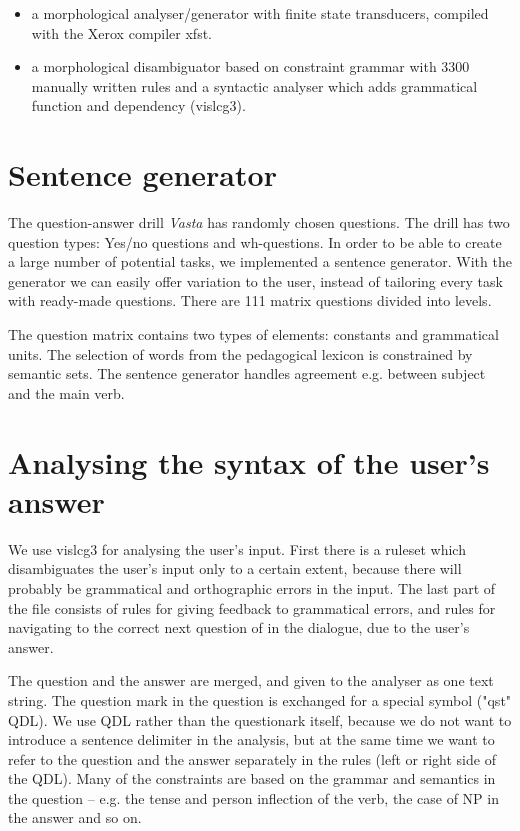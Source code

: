 \documentclass[11pt]{article}
\begin{document}
\begin{itemize}
\item a morphological analyser/generator with finite state transducers, compiled with the Xerox compiler xfst.  
\item a morphological disambiguator based on constraint grammar with 3300 manually written rules and a syntactic analyser which adds grammatical function and dependency (vislcg3). 
\end{itemize}


\section{Sentence generator}
The question-answer drill \textit{Vasta} has randomly chosen questions. The drill has two question types: Yes/no questions and wh-questions. In order to be able to create a large number of potential tasks, we implemented a sentence generator. With the generator we can easily offer variation to the user, instead of tailoring every task with ready-made questions. There are 111 matrix questions divided into levels.

The question matrix contains two types of elements: constants and grammatical units. The selection of words from the pedagogical lexicon is constrained by semantic sets. The sentence generator handles agreement e.g. between subject and the main verb.
 
\section{Analysing the syntax of the user's answer} 
We use vislcg3 for analysing the user's input. First there is a ruleset which disambiguates the user's input only to a certain extent, because there will probably be grammatical and orthographic errors in the input. The last part of the file consists of rules for giving feedback to grammatical errors, and rules for navigating to the correct next question of in the dialogue, due to the user's answer.  

The question and the answer are merged, and given to the analyser as one text string. The question mark in the question is exchanged for a special symbol ("qst" QDL). We use QDL rather than the questionark itself, because we do not want to introduce a sentence delimiter in the analysis, but at the same time we want to refer to the question and the answer separately in the rules (left or right side of the QDL). Many of the constraints are based on the grammar and semantics in the question -- e.g. the tense and person inflection of the verb, the case of NP in the answer and so on.
\end{document}
